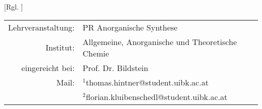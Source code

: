 [Rgl. ]{}{}
  
\maketitle %
  
\begin{center}
  \begin{tabular}{r p{4.1cm}}
    Lehrveranstaltung: & PR Anorganische Synthese \\
    Institut: & Allgemeine, Anorganische und Theoretische Chemie \\
    eingereicht bei: & Prof. Dr. Bildstein \\%
    Mail: & $^1$thomas.hintner@student.uibk.ac.at \\
          & $^2$florian.kluibenschedl@student.uibk.ac.at
  \end{tabular}
\end{center}

